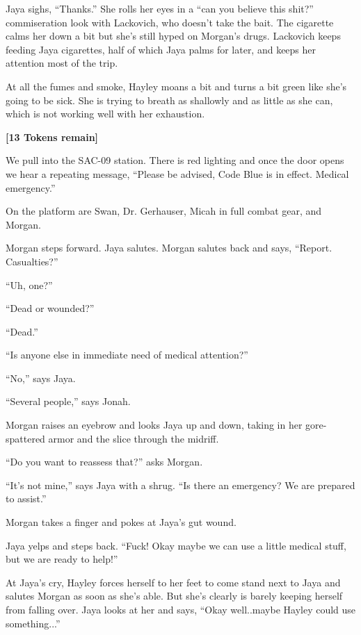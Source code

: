 Jaya sighs, ``Thanks.'' She rolls her eyes in a ``can you believe this shit?'' commiseration look with Lackovich, who doesn't take the bait.  The cigarette calms her down a bit but she's still hyped on Morgan's drugs.  Lackovich keeps feeding Jaya cigarettes, half of which Jaya palms for later, and keeps her attention most of the trip.

At all the fumes and smoke, Hayley moans a bit and turns a bit green like she's going to be sick. She is trying to breath as shallowly and as little as she can, which is not working well with her exhaustion.



\textbf{{[}13 Tokens remain{]}}


\newpage


We pull into the SAC-09 station.  There is red lighting and once the door opens we hear a repeating message, ``Please be advised, Code Blue is in effect.  Medical emergency.''

On the platform are Swan, Dr. Gerhauser, Micah in full combat gear, and Morgan.



Morgan steps forward.  Jaya salutes.  Morgan salutes back and says, ``Report.  Casualties?''

``Uh, one?''

``Dead or wounded?''

``Dead.''

``Is anyone else in immediate need of medical attention?''

``No,'' says Jaya.

``Several people,'' says Jonah.

Morgan raises an eyebrow and looks Jaya up and down, taking in her gore-spattered armor and the slice through the midriff.

``Do you want to reassess that?'' asks Morgan.

``It's not mine,'' says Jaya with a shrug.  ``Is there an emergency?  We are prepared to assist.''

Morgan takes a finger and pokes at Jaya's gut wound.

Jaya yelps and steps back. ``Fuck!  Okay maybe we can use a little medical stuff, but we are ready to help!''

At Jaya's cry, Hayley forces herself to her feet to come stand next to Jaya and salutes Morgan as soon as she's able.  But she's clearly is barely keeping herself from falling over.  Jaya looks at her and says, ``Okay well..maybe Hayley could use something...''

